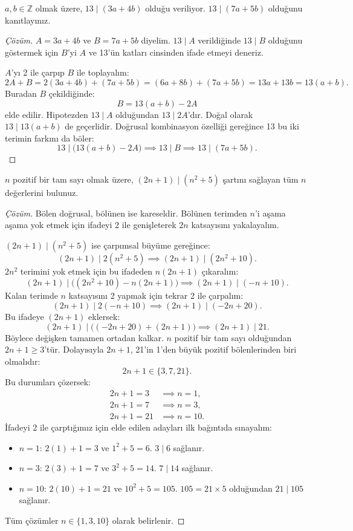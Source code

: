\begin{example}
$a, b \in \mathbb{Z}$ olmak üzere, $13 \mid (3a + 4b)$ olduğu veriliyor. $13 \mid (7a + 5b)$ olduğunu kanıtlayınız.
\end{example}

\begin{proof}[Çözüm]
$A = 3a + 4b$ ve $B = 7a + 5b$ diyelim. $13 \mid A$ verildiğinde $13 \mid B$ olduğunu göstermek için $B$'yi $A$ ve 13'ün katları cinsinden ifade etmeyi deneriz. 

$A$'yı 2 ile çarpıp $B$ ile toplayalım:
\[
2A + B = 2(3a + 4b) + (7a + 5b) = (6a + 8b) + (7a + 5b) = 13a + 13b = 13(a + b).
\]
Buradan $B$ çekildiğinde:
\[
B = 13(a + b) - 2A
\]
elde edilir. Hipotezden $13 \mid A$ olduğundan $13 \mid 2A$'dır. Doğal olarak $13 \mid 13(a+b)$ de geçerlidir. Doğrusal kombinasyon özelliği gereğince 13 bu iki terimin farkını da böler:
\[
13 \mid \Big(13(a+b) - 2A\Big) \implies 13 \mid B \implies 13 \mid (7a + 5b).
\]
\end{proof}

\begin{example}
$n$ pozitif bir tam sayı olmak üzere, $(2n+1) \mid (n^2 + 5)$ şartını sağlayan tüm $n$ değerlerini bulunuz.
\end{example}

\begin{proof}[Çözüm]
Bölen doğrusal, bölünen ise kareseldir. Bölünen terimden $n$'i aşama aşama yok etmek için ifadeyi 2 ile genişleterek $2n$ katsayısını yakalayalım.

$(2n+1) \mid (n^2 + 5)$ ise çarpımsal büyüme gereğince:
\[
(2n+1) \mid 2(n^2 + 5) \implies (2n+1) \mid (2n^2 + 10).
\]
$2n^2$ terimini yok etmek için bu ifadeden $n(2n+1)$ çıkaralım:
\[
(2n+1) \mid \Big( (2n^2 + 10) - n(2n+1) \Big) \implies (2n+1) \mid (-n + 10).
\]
Kalan terimde $n$ katsayısını 2 yapmak için tekrar 2 ile çarpalım:
\[
(2n+1) \mid 2(-n + 10) \implies (2n+1) \mid (-2n + 20).
\]
Bu ifadeye $(2n+1)$ eklersek:
\[
(2n+1) \mid \Big( (-2n + 20) + (2n+1) \Big) \implies (2n+1) \mid 21.
\]
Böylece değişken tamamen ortadan kalkar. $n$ pozitif bir tam sayı olduğundan $2n+1 \ge 3$'tür. Dolayısıyla $2n+1$, 21'in 1'den büyük pozitif bölenlerinden biri olmalıdır:
\[
2n+1 \in \{3, 7, 21\}.
\]
Bu durumları çözersek:
\begin{align*}
2n + 1 = 3 &\implies n = 1, \\
2n + 1 = 7 &\implies n = 3, \\
2n + 1 = 21 &\implies n = 10.
\end{align*}
İfadeyi 2 ile çarptığımız için elde edilen adayları ilk bağıntıda sınayalım:
\begin{itemize}
    \item $n = 1$: $2(1)+1 = 3$ ve $1^2+5 = 6$. $3 \mid 6$ sağlanır.
    \item $n = 3$: $2(3)+1 = 7$ ve $3^2+5 = 14$. $7 \mid 14$ sağlanır.
    \item $n = 10$: $2(10)+1 = 21$ ve $10^2+5 = 105$. $105 = 21 \times 5$ olduğundan $21 \mid 105$ sağlanır.
\end{itemize}
Tüm çözümler $n \in \{1, 3, 10\}$ olarak belirlenir.
\end{proof}

